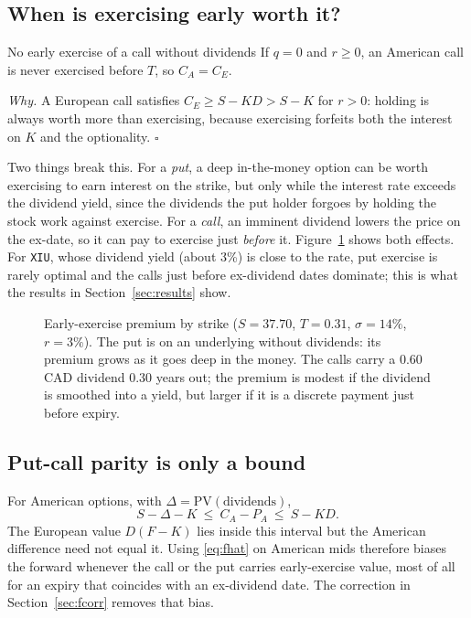 \documentclass[11pt]{article}
\begin{document}
\subsection{When is exercising early worth it?}

\begin{fact}{No early exercise of a call without dividends}
If $q=0$ and $r\ge0$, an American call is never exercised before $T$, so
$C_A=C_E$.
\end{fact}

\noindent\emph{Why.} A European call satisfies $C_E\ge S-KD>S-K$ for $r>0$:
holding is always worth more than exercising, because exercising forfeits both
the interest on $K$ and the optionality. \hfill$\square$

Two things break this. For a \emph{put}, a deep in-the-money option can be worth
exercising to earn interest on the strike, but only while the interest rate
exceeds the dividend yield, since the dividends the put holder forgoes by
holding the stock work against exercise. For a \emph{call}, an imminent
dividend lowers the price on the ex-date, so it can pay to exercise just
\emph{before} it. Figure~\ref{fig:premium} shows both effects. For \texttt{XIU},
whose dividend yield (about 3\%) is close to the rate, put exercise is rarely
optimal and the calls just before ex-dividend dates dominate; this is what the
results in Section~\ref{sec:results} show.

\begin{figure}[ht]
\centering

\caption{Early-exercise premium by strike ($S=37.70$, $T=0.31$, $\sigma=14\%$,
$r=3\%$). The put is on an underlying without dividends: its premium grows as it
goes deep in the money. The calls carry a 0.60 CAD dividend 0.30 years out; the
premium is modest if the dividend is smoothed into a yield, but larger if it is a
discrete payment just before expiry.}
\label{fig:premium}
\end{figure}

\subsection{Put-call parity is only a bound}\label{sec:am-parity}

For American options, with $\Delta=\mathrm{PV}(\text{dividends})$,
\begin{equation}
  S-\Delta-K\ \le\ C_A-P_A\ \le\ S-KD.
\end{equation}
The European value $D(F-K)$ lies inside this interval but the American difference
need not equal it. Using \eqref{eq:fhat} on American mids therefore biases the
forward whenever the call or the put carries early-exercise value, most of all
for an expiry that coincides with an ex-dividend date. The correction in
Section~\ref{sec:fcorr} removes that bias.
\end{document}

